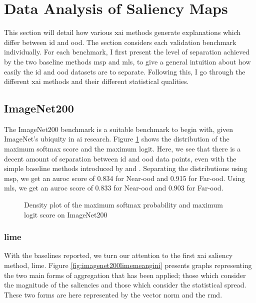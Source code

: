\documentclass[UKenglish]{uiomasterthesis} %
\theoremstyle{definition}
\begin{document}
\section{Data Analysis of Saliency Maps} \label{section:saliencyagg}

This section will detail how various \ac{xai} methods generate explanations which differ between \ac{id} and \ac{ood}. The section considers each validation benchmark individually. For each benchmark, I first present the level of separation achieved by the two baseline methods \ac{msp} and \ac{mls}, to give a general intuition about how easily the \ac{id} and \ac{ood} datasets are to separate. Following this, I go through the different \ac{xai} methods and their different statistical qualities.

\subsection{ImageNet200}

The ImageNet200 benchmark is a suitable benchmark to begin with, given ImageNet's ubiquity in \ac{ai} research. Figure \ref{fig:imagenet200logits} shows the distribution of the maximum softmax score and the maximum logit. Here, we see that there is a decent amount of separation between \ac{id} and \ac{ood} data points, even with the simple baseline methods introduced by \cite{oodbaseline} and \cite{mls}. Separating the distributions using \ac{msp}, we get an \ac{auroc} score of 0.834 for Near-\ac{ood} and 0.915 for Far-\ac{ood}. Using \ac{mls}, we get an \ac{auroc} score of 0.833 for Near-\ac{ood} and 0.903 for Far-\ac{ood}.

\begin{figure}[H]
    \begin{center}
        
    \end{center}
    \caption{Density plot of the maximum softmax probability and maximum logit score on ImageNet200}
    \label{fig:imagenet200logits}
\end{figure}

\subsubsection{\ac{lime}}

With the baselines reported, we turn our attention to the first \ac{xai} saliency method, \ac{lime}. Figure \ref{fig:imagenet200limemeangini} presents graphs representing the two main forms of aggregation that has been applied; those which consider the magnitude of the saliencies and those which consider the statistical spread. These two forms are here represented by the vector norm and the \ac{rmd}.
\end{document}
